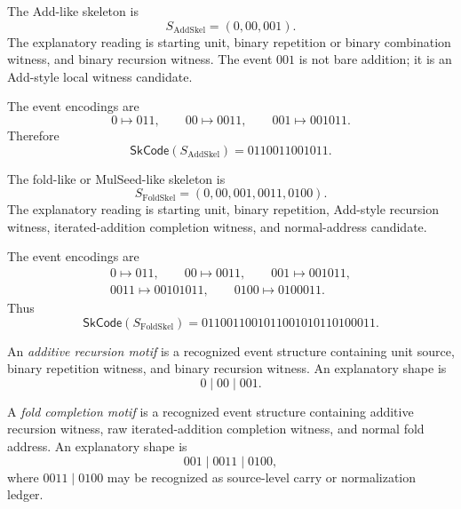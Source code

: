\begin{definition}
\label{def:case-studies-add-skeleton}
The Add-like skeleton is
$$
  S_{\mathrm{AddSkel}}
  =
  (0,00,001).
$$
The explanatory reading is starting unit, binary repetition or binary combination witness, and binary recursion witness. The event $001$ is not bare addition; it is an Add-style local witness candidate.
\end{definition}

\begin{example}
\label{ex:case-studies-add-code}
The event encodings are
$$
  0\mapsto 011,\qquad
  00\mapsto 0011,\qquad
  001\mapsto 001011.
$$
Therefore
$$
  \mathsf{SkCode}(S_{\mathrm{AddSkel}})
  =
  0110011001011.
$$
\end{example}

\begin{definition}
\label{def:case-studies-fold-skeleton}
The fold-like or MulSeed-like skeleton is
$$
  S_{\mathrm{FoldSkel}}
  =
  (0,00,001,0011,0100).
$$
The explanatory reading is starting unit, binary repetition, Add-style recursion witness, iterated-addition completion witness, and normal-address candidate.
\end{definition}

\begin{example}
\label{ex:case-studies-fold-code}
The event encodings are
$$
\begin{gathered}
  0\mapsto 011,\qquad
  00\mapsto 0011,\qquad
  001\mapsto 001011,\\
  0011\mapsto 00101011,\qquad
  0100\mapsto 0100011.
\end{gathered}
$$
Thus
$$
  \mathsf{SkCode}(S_{\mathrm{FoldSkel}})
  =
  0110011001011001010110100011.
$$
\end{example}

\begin{definition}
\label{def:case-studies-additive-recursion-motif}
An \emph{additive recursion motif} is a recognized event structure containing unit source, binary repetition witness, and binary recursion witness. An explanatory shape is
$$
  0\mid 00\mid 001.
$$
\end{definition}

\begin{definition}
\label{def:case-studies-fold-completion-motif}
A \emph{fold completion motif} is a recognized event structure containing additive recursion witness, raw iterated-addition completion witness, and normal fold address. An explanatory shape is
$$
  001\mid 0011\mid 0100,
$$
where $0011\mid 0100$ may be recognized as source-level carry or normalization ledger.
\end{definition}

